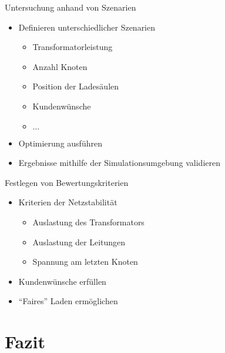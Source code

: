 \documentclass[aspectratio=169]{beamer}
\begin{document}
\begin{frame}{Untersuchung anhand von Szenarien}
	\begin{itemize}
		\item Definieren unterschiedlicher Szenarien
		\begin{itemize}
			\item Transformatorleistung
			\item Anzahl Knoten
			\item Position der Ladesäulen
			\item Kundenwünsche
			\item $\dots$
		\end{itemize}
		\item Optimierung ausführen
		\item Ergebnisse mithilfe der Simulationsumgebung validieren
	\end{itemize}
\end{frame}


\begin{frame}{Festlegen von Bewertungskriterien}
	\begin{itemize}
		\item Kriterien der Netzstabilität
		\begin{itemize}
			\item Auslastung des Transformators
			\item Auslastung der Leitungen
			\item Spannung am letzten Knoten
		\end{itemize}
		\item Kundenwünsche erfüllen
		\item \enquote{Faires} Laden ermöglichen
	\end{itemize}
\end{frame}


\section{Fazit}
\end{document}
